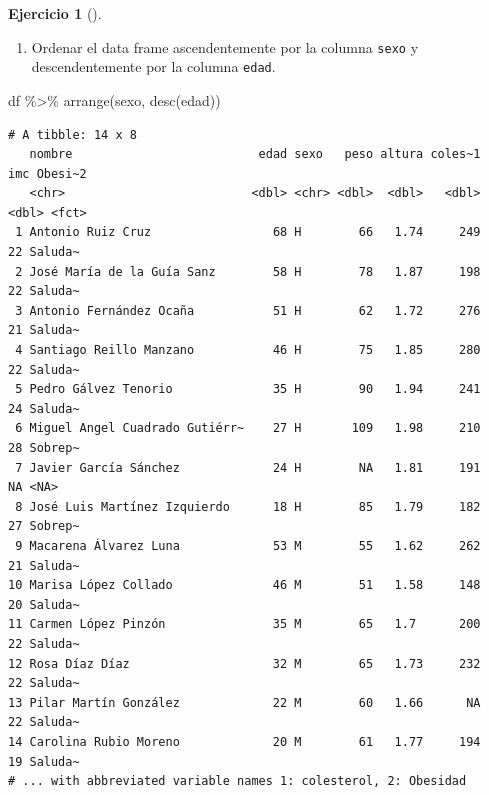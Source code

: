 \documentclass[
  a4paper,
]{scrreport}
\newenvironment{Shaded}{\begin{snugshade}}{\end{snugshade}}
\newcommand{\FunctionTok}[1]{\textcolor[rgb]{0.28,0.35,0.67}{#1}}
\newcommand{\NormalTok}[1]{\textcolor[rgb]{0.00,0.23,0.31}{#1}}
\newcommand{\SpecialCharTok}[1]{\textcolor[rgb]{0.37,0.37,0.37}{#1}}
\providecommand{\tightlist}{%
  \setlength{\itemsep}{0pt}\setlength{\parskip}{0pt}}\usepackage{longtable,booktabs,array}
\theoremstyle{definition}
\newtheorem{exercise}{Ejercicio}[chapter]
\theoremstyle{remark}
\begin{document}
\begin{exercise}[]
\begin{tcolorbox}
\end{tcolorbox}

\begin{enumerate}
\def\labelenumi{\alph{enumi}.}
\setcounter{enumi}{10}
\tightlist
\item
  Ordenar el data frame ascendentemente por la columna \texttt{sexo} y
  descendentemente por la columna \texttt{edad}.
\end{enumerate}

\begin{tcolorbox}[enhanced jigsaw, rightrule=.15mm, toptitle=1mm, colbacktitle=quarto-callout-tip-color!10!white, titlerule=0mm, colback=white, leftrule=.75mm, bottomtitle=1mm, colframe=quarto-callout-tip-color-frame, breakable, title=\textcolor{quarto-callout-tip-color}{\faLightbulb}\hspace{0.5em}{Solución}, arc=.35mm, coltitle=black, opacityback=0, bottomrule=.15mm, opacitybacktitle=0.6, left=2mm, toprule=.15mm]

\begin{Shaded}
\begin{Highlighting}[]
\NormalTok{df }\SpecialCharTok{\%\textgreater{}\%}
    \FunctionTok{arrange}\NormalTok{(sexo, }\FunctionTok{desc}\NormalTok{(edad))}
\end{Highlighting}
\end{Shaded}

\begin{verbatim}
# A tibble: 14 x 8
   nombre                          edad sexo   peso altura coles~1   imc Obesi~2
   <chr>                          <dbl> <chr> <dbl>  <dbl>   <dbl> <dbl> <fct>  
 1 Antonio Ruiz Cruz                 68 H        66   1.74     249    22 Saluda~
 2 José María de la Guía Sanz        58 H        78   1.87     198    22 Saluda~
 3 Antonio Fernández Ocaña           51 H        62   1.72     276    21 Saluda~
 4 Santiago Reillo Manzano           46 H        75   1.85     280    22 Saluda~
 5 Pedro Gálvez Tenorio              35 H        90   1.94     241    24 Saluda~
 6 Miguel Angel Cuadrado Gutiérr~    27 H       109   1.98     210    28 Sobrep~
 7 Javier García Sánchez             24 H        NA   1.81     191    NA <NA>   
 8 José Luis Martínez Izquierdo      18 H        85   1.79     182    27 Sobrep~
 9 Macarena Álvarez Luna             53 M        55   1.62     262    21 Saluda~
10 Marisa López Collado              46 M        51   1.58     148    20 Saluda~
11 Carmen López Pinzón               35 M        65   1.7      200    22 Saluda~
12 Rosa Díaz Díaz                    32 M        65   1.73     232    22 Saluda~
13 Pilar Martín González             22 M        60   1.66      NA    22 Saluda~
14 Carolina Rubio Moreno             20 M        61   1.77     194    19 Saluda~
# ... with abbreviated variable names 1: colesterol, 2: Obesidad
\end{verbatim}

\end{tcolorbox}

\end{exercise}
\end{document}
